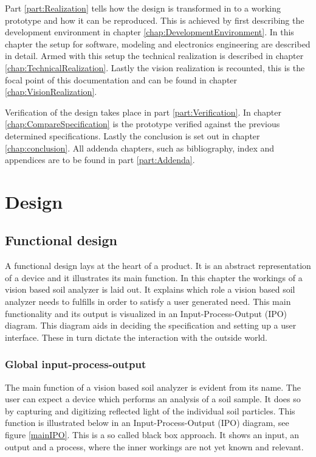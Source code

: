 \documentclass[11pt,fleqn,,a4paper,twoside,openright]{book}
\begin{document}
Part \ref{part:Realization} tells how the design is transformed in to a working prototype and how it can be reproduced. This is achieved by first describing the development environment in chapter \ref{chap:DevelopmentEnvironment}. In this chapter the setup for software, modeling and electronics engineering are described in detail. Armed with this setup the technical realization is described in chapter \ref{chap:TechnicalRealization}. Lastly the vision realization is recounted, this is the focal point of this documentation and can be found in chapter \ref{chap:VisionRealization}.

Verification of the design takes place in part \ref{part:Verification}. In chapter \ref{chap:CompareSpecification} is the prototype verified against the previous determined specifications. Lastly the conclusion is set out in chapter \ref{chap:conclusion}. All addenda chapters, such as bibliography, index and appendices are to be found in part \ref{part:Addenda}. 

\part{Design}\label{part:Design}

\chapter{Functional design}\label{chap:FunctionalDesiging}
A functional design lays at the heart of a product. It is an abstract representation of a device and it illustrates its main function. In this chapter the workings of a vision based soil analyzer is laid out. It explains which role a vision based soil analyzer needs to fulfills in order to satisfy a user generated need. This main functionality and its output is visualized in an Input-Process-Output (IPO) diagram. This diagram aids in deciding the specification and setting up a user interface. These in turn dictate the interaction with the outside world.

\section{Global input-process-output}
The main function of a vision based soil analyzer is evident from its name. The user can expect a device which performs an analysis of a soil sample. It does so by capturing and digitizing reflected light of the individual soil particles. This function is illustrated below in an Input-Process-Output (IPO) diagram, see figure \ref{mainIPO}. This is a so called black box approach. It shows an input, an output and a process, where the inner workings are not yet known and relevant.   
\end{document}
